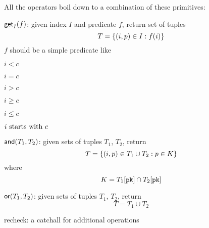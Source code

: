 All the operators boil down to a combination of these primitives:

\begin{oparts}
\item
  $\mathsf{get}_I(f)$:
  given index $I$ and predicate $f$, return set of tuples
  \[
    T = \lbrace(i, p) \in I : f(i)\rbrace
  \]
  $f$ should be a simple predicate like
  \begin{oparts}
  \item
    $i < c$
  \item
    $i = c$
  \item
    $i > c$
  \item
    $i \geq c$
  \item
    $i \leq c$
  \item
    $i~\textnormal{starts with}~c$
  \end{oparts}
\item
  $\mathsf{and}(T_1, T_2)$:
  given sets of tuples $T_1$, $T_2$, return
  \[
    T = \lbrace(i, p) \in T_1 \cup T_2 : p \in K\rbrace
  \]
  where
  \[
    K = T_1[\mathtt{pk}] \cap T_2[\mathtt{pk}]
  \]
\item
  $\mathsf{or}(T_1, T_2)$:
  given sets of tuples $T_1$, $T_2$, return
  \[
    T = T_1 \cup T_2
  \]
\item
  recheck: a catchall for additional operations
\end{oparts}
